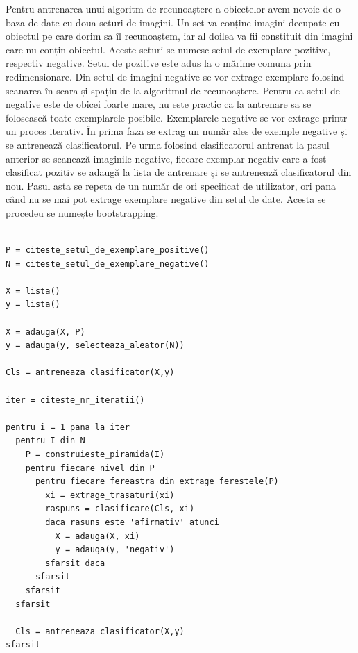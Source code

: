 Pentru antrenarea unui algoritm de recunoaștere a obiectelor avem nevoie de o baza de date cu doua seturi de imagini.
Un set va conține imagini decupate cu obiectul pe care dorim sa îl recunoaștem, iar al doilea va fii constituit din imagini care nu conțin obiectul.
Aceste seturi se numesc setul de exemplare pozitive, respectiv negative.
Setul de pozitive este adus la o mărime comuna prin redimensionare.
Din setul de imagini negative se vor extrage exemplare folosind scanarea în scara și spațiu de la algoritmul de recunoaștere.
Pentru ca setul de negative este de obicei foarte mare, nu este practic ca la antrenare sa se folosească toate exemplarele posibile.
Exemplarele negative se vor extrage printr-un proces iterativ.
În prima faza se extrag un număr ales de exemple negative și se antrenează clasificatorul.
Pe urma folosind clasificatorul antrenat la pasul anterior se scanează imaginile negative, fiecare exemplar negativ care a fost clasificat pozitiv se adaugă la lista de antrenare și se antrenează clasificatorul din nou.
Pasul asta se repeta de un număr de ori specificat de utilizator, ori pana când nu se mai pot extrage exemplare negative din setul de date.
Acesta se procedeu se numește bootstrapping.

\begin{mdframed}
\begin{verbatim}

P = citeste_setul_de_exemplare_positive()
N = citeste_setul_de_exemplare_negative()

X = lista()
y = lista()

X = adauga(X, P)
y = adauga(y, selecteaza_aleator(N))

Cls = antreneaza_clasificator(X,y)

iter = citeste_nr_iteratii()

pentru i = 1 pana la iter
  pentru I din N
    P = construieste_piramida(I)
    pentru fiecare nivel din P
      pentru fiecare fereastra din extrage_ferestele(P)
        xi = extrage_trasaturi(xi)
        raspuns = clasificare(Cls, xi)
        daca rasuns este 'afirmativ' atunci
          X = adauga(X, xi)
          y = adauga(y, 'negativ')
        sfarsit daca
      sfarsit
    sfarsit
  sfarsit
  
  Cls = antreneaza_clasificator(X,y)
sfarsit

\end{verbatim}
\end{mdframed}



















